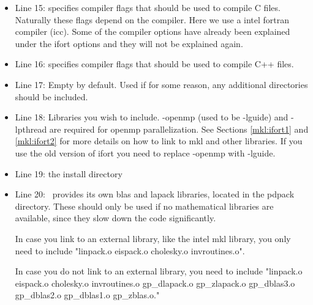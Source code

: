 \begin{itemize}
\item Line 15:  specifies compiler flags that should be used to compile C files. Naturally these flags depend on the compiler. Here we use a intel fortran compiler (icc). Some of the compiler options have already been explained under the ifort options and they will not be explained again.
\item Line 16:  specifies compiler flags that should be used to compile C++ files. 
\item Line 17: Empty by default. Used if for some reason, any additional directories should be included.
\item Line 18: Libraries you wish to include. -openmp (used to be -lguide) and -lpthread are required for openmp parallelization. See Sections \ref{mkl:ifort1} and \ref{mkl:ifort2} for more details on how to link to mkl and other libraries. If you use the old version of ifort you need to replace -openmp with -lguide. 
\item Line 19: the install directory 
\item Line 20: \lsdalton\ provides its own blas and lapack libraries, located in the pdpack directory. These should only be used
if no mathematical libraries are available, since they slow down the code significantly. 

In case you link to an external library, like the intel mkl library, you only need to include "linpack.o eispack.o cholesky.o invroutines.o".

In case you do not link to an external library, you need to include "linpack.o eispack.o cholesky.o invroutines.o gp\_dlapack.o gp\_zlapack.o gp\_dblas3.o gp\_dblas2.o gp\_dblas1.o gp\_zblas.o."
\end{itemize}

